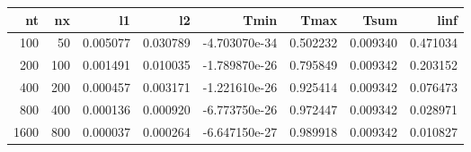 \begin{tabular}{rrrrrrrr}
\toprule
   nt &   nx &        l1 &        l2 &          Tmin &      Tmax &      Tsum &      linf \\
\midrule
  100 &   50 &  0.005077 &  0.030789 & -4.703070e-34 &  0.502232 &  0.009340 &  0.471034 \\
  200 &  100 &  0.001491 &  0.010035 & -1.789870e-26 &  0.795849 &  0.009342 &  0.203152 \\
  400 &  200 &  0.000457 &  0.003171 & -1.221610e-26 &  0.925414 &  0.009342 &  0.076473 \\
  800 &  400 &  0.000136 &  0.000920 & -6.773750e-26 &  0.972447 &  0.009342 &  0.028971 \\
 1600 &  800 &  0.000037 &  0.000264 & -6.647150e-27 &  0.989918 &  0.009342 &  0.010827 \\
\bottomrule
\end{tabular}
